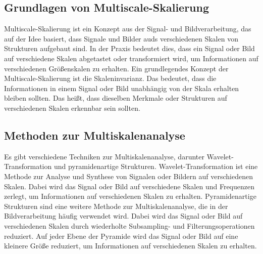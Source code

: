     \subsection{Grundlagen von Multiscale-Skalierung}
    
        Multiscale-Skalierung ist ein Konzept aus der Signal- und Bildverarbeitung, das auf der Idee basiert, dass Signale und Bilder auds verschiedenen Skalen von Strukturen aufgebaut sind.
        In der Praxis bedeutet dies, dass ein Signal oder Bild auf verschiedene Skalen abgetastet oder transformiert wird, um Informationen auf verschiedenen Größenskalen zu erhalten.
        Ein grundlegendes Konzept der Multiscale-Skalierung ist die Skaleninvarianz.      
        Das bedeutet, dass die Informationen in einem Signal oder Bild unabhängig von der Skala erhalten bleiben sollten.      
        Das heißt, dass dieselben Merkmale oder Strukturen auf verschiedenen Skalen erkennbar sein sollten.
    
    \subsection{Methoden zur Multiskalenanalyse}
    
        Es gibt verschiedene Techniken zur Multiskalenanalyse, darunter Wavelet-Transformation und pyramidenartige Strukturen.      
        Wavelet-Transformation ist eine Methode zur Analyse und Synthese von Signalen oder Bildern auf verschiedenen Skalen.      
        Dabei wird das Signal oder Bild auf verschiedene Skalen und Frequenzen zerlegt, um Informationen auf verschiedenen Skalen zu erhalten.
        Pyramidenartige Strukturen sind eine weitere Methode zur Multiskalenanalyse, die in der Bildverarbeitung häufig verwendet wird.      
        Dabei wird das Signal oder Bild auf verschiedenen Skalen durch wiederholte Subsampling- und Filterungsoperationen reduziert.      
        Auf jeder Ebene der Pyramide wird das Signal oder Bild auf eine kleinere Größe reduziert, um Informationen auf verschiedenen Skalen zu erhalten.
    
